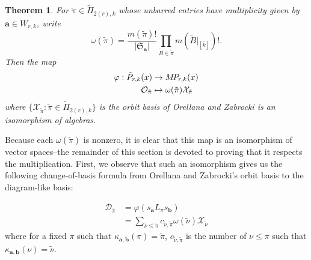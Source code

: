 \documentclass[10pt]{amsart}
\theoremstyle{definition}
\theoremstyle{definition}
\theoremstyle{plain}
\theoremstyle{remark}
\theoremstyle{plain}
\newtheorem{theorem}[theorem]{Theorem}
\theoremstyle{plain}
\newcommand{\XX}{\mathcal{X}}
\newcommand{\OO}{\mathcal{O}}
\newcommand{\DD}{\mathcal{D}}
\newcommand{\SG}{\mathfrak{S}}
\newcommand{\bfa}{{\boldsymbol{a}}}
\newcommand{\bfb}{{\boldsymbol{b}}}
\newcommand{\MP}{{\rm M\!P\!}}
\newcommand{\tpi}{{\tilde{\pi}}}
\newcommand{\tnu}{{\tilde{\nu}}}
\newcommand{\tB}{{\tilde{B}}}
\newcommand{\ov}[1]{\bar{#1}}
\newcommand{\ovb}[1]{\left[\ov{#1}\right]}
\newcommand{\abs}[1]{\left| #1\right |}
\begin{document}
\begin{theorem}\label{thm:change_of_basis} For $\tpi\in\tilde\Pi_{2(r),k}$ whose unbarred entries have multiplicity given by $\bfa\in W_{r,k}$, write \[\omega(\tpi)=\frac{m(\tpi)!}{\abs{\SG_\bfa}}\prod_{\tB\in\tpi}m(\tB|_{\ovb{k}})!.\] Then the map \begin{align*}
    \varphi:\tilde{P}_{r,k}(x)&\to\MP_{r,k}(x)\\
    \OO_\tpi&\mapsto \omega(\tpi)\XX_\tpi
\end{align*} where $\{\XX_\tpi:\tpi\in\tilde\Pi_{2(r),k}\}$ is the orbit basis of Orellana and Zabrocki is an isomorphism of algebras.
\end{theorem}

Because each $\omega(\tpi)$ is nonzero, it is clear that this map is an isomorphism of vector spaces--the remainder of this section is devoted to proving that it respects the multiplication. First, we observe that such an isomorphism gives us the following change-of-basis formula from Orellana and Zabrocki's orbit basis to the diagram-like basis:

\begin{align*}
    \DD_\tpi&=\varphi(s_\bfa L_\pi s_\bfb)\\
            &=\sum_{\tnu\leq\tpi} c_{\tnu,\tpi}\omega(\tnu)\XX_\tnu
\end{align*} where for a fixed $\pi$ such that $\kappa_{\bfa,\bfb}(\pi)=\tpi$, $c_{\tnu,\tpi}$ is the number of $\nu\leq\pi$ such that $\kappa_{\bfa,\bfb}(\nu)=\tnu$.
\end{document}

